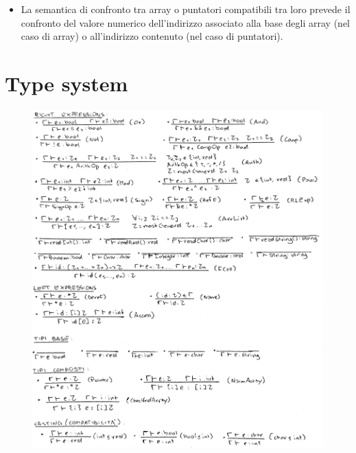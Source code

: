 \documentclass{report}
\begin{document}
\begin{itemize}
\begin{center}
\begin{tabular}{ | c | c | }
        \end{tabular}
        \end{center}

    \item La semantica di confronto tra array o puntatori compatibili tra loro prevede il confronto
        del valore numerico dell'indirizzo associato alla base degli array (nel caso di array) o all'indirizzo
        contenuto (nel caso di puntatori).

\end{itemize}

\chapter {Type system}

\begin{figure}
    \centering
    \includegraphics[width = 1.2\linewidth]{typesystem2}
\end{figure}
\end{document}
